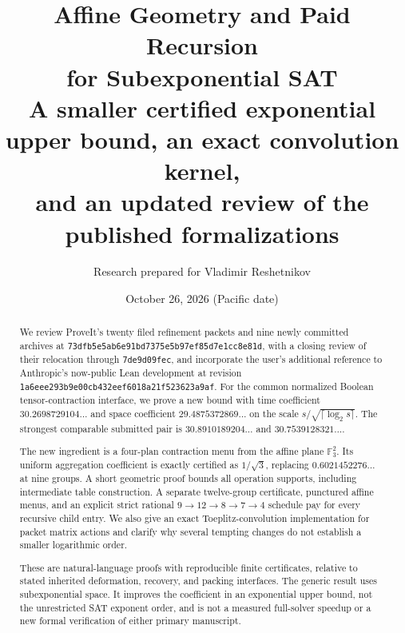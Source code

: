\documentclass[11pt]{article}
\title{Affine Geometry and Paid Recursion\\for Subexponential SAT\\[6pt]\large A smaller certified exponential upper bound, an exact convolution kernel,\\and an updated review of the published formalizations}
\author{Research prepared for Vladimir Reshetnikov}
\date{October 26, 2026 (Pacific date)}
\theoremstyle{remark}\newtheorem{remark}[theorem]{Remark}
\newcommand{\F}{\mathbb F}
\newcommand{\pin}{\texttt{73dfb5e5ab6e91bd7375e5b97ef85d7e1cc8e81d}}
\begin{document}
\maketitle
\begin{abstract}
We review ProveIt's twenty filed refinement packets and nine newly committed
archives at \pin, with a closing review of their relocation through
\texttt{7de9d09fec}, and incorporate the user's additional reference to
Anthropic's now-public Lean development at revision
\texttt{1a6eee293b9e00cb432eef6018a21f523623a9af}.
For the common normalized Boolean tensor-contraction interface, we prove a
new bound with time coefficient $30.2698729104\ldots$ and space coefficient
$29.4875372869\ldots$ on the scale $s/\sqrt{\lceil\log_2s\rceil}$.
The strongest comparable submitted pair is $30.8910189204\ldots$ and
$30.7539128321\ldots$.

The new ingredient is a four-plan contraction menu from the affine plane
$\F_3^2$. Its uniform aggregation coefficient is exactly certified as
$1/\sqrt3$, replacing $0.6021452276\ldots$ at nine groups. A short geometric
proof bounds all operation supports, including intermediate table construction.
A separate twelve-group certificate, punctured affine menus, and an explicit
strict rational $9\to12\to8\to7\to4$ schedule pay for every recursive child
entry. We also give an exact Toeplitz-convolution implementation for packet
matrix actions and clarify why several tempting changes do not establish a
smaller logarithmic order.

These are natural-language proofs with reproducible finite certificates,
relative to stated inherited deformation, recovery, and packing interfaces.
The generic result uses subexponential space. It improves the coefficient in
an exponential upper bound, not the unrestricted SAT exponent order, and is
not a measured full-solver speedup or a new formal verification of either
primary manuscript.
\end{abstract}
\setcounter{tocdepth}{1}{\small\tableofcontents}\newpage








\end{document}
